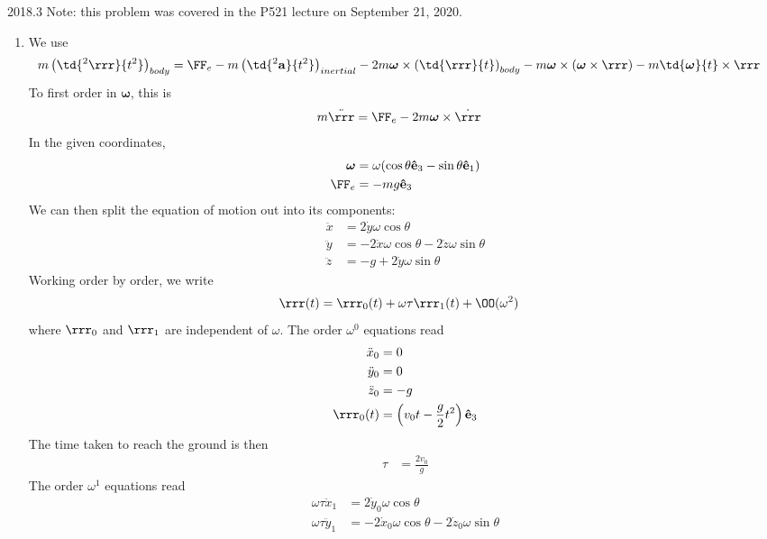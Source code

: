 \documentclass[12pt]{article}
\begin{document}
\newcommand{\oo}{\boldsymbol{\omega}}
\newcommand{\ee}{\mathbf{\hat{e}}}
\begin{solution}{2018.3}
Note: this problem was covered in the P521 lecture on September 21, 2020.
\begin{enumerate}
\item
We use
\begin{align*}
m \left( \td{^2 \rrr}{t^2} \right)_{body} & = \FF_e - m \left( \td{^2 \mathbf{a}}{t^2} \right)_{inertial}
- 2m \oo \times \left( \td{\rrr}{t} \right)_{body}
- m \oo \times (\oo \times \rrr) - m \td{\oo}{t} \times \rrr
\end{align*}
To first order in $\oo$, this is
\begin{align*}
m \ddot{\rrr} & = \FF_e - 2m \oo \times \dot{\rrr}
\end{align*}
In the given coordinates,
\begin{align*}
\oo & = \omega ( \cos \theta \ee_3 - \sin \theta \ee_1 ) \\
\FF_e & = -mg \ee_3
\end{align*}
We can then split the equation of motion out into its components:
\begin{align*}
\ddot{x} & = 2\dot{y} \omega \cos \theta \\
\ddot{y} & = -2\dot{x} \omega \cos \theta - 2\dot{z} \omega \sin \theta \\
\ddot{z} & = -g + 2 \dot{y} \omega \sin \theta
\end{align*}
Working order by order, we write
\begin{align*}
\rrr(t) & = \rrr_0(t) + \omega \tau \rrr_1(t) + \OO(\omega^2)
\end{align*}
where $\rrr_0$ and $\rrr_1$ are independent of $\omega$.
The order $\omega^0$ equations read
\begin{align*}
\ddot{x}_0 & = 0 \\
\ddot{y}_0 & = 0 \\
\ddot{z}_0 & = -g \\
\rrr_0(t) & = \left( v_0 t - \frac{g}{2} t^2 \right) \ee_3
\end{align*}
The time taken to reach the ground is then
\begin{align*}
\tau & = \frac{2v_0}{g}
\end{align*}
The order $\omega^1$ equations read
\begin{align*}
\omega \tau \ddot{x}_1 & = 2\dot{y}_0 \omega \cos \theta \\
\omega \tau \ddot{y}_1 & = -2\dot{x}_0 \omega \cos \theta - 2\dot{z}_0 \omega \sin \theta \\

\end{align*}
\end{enumerate}
\end{solution}
\end{document}
